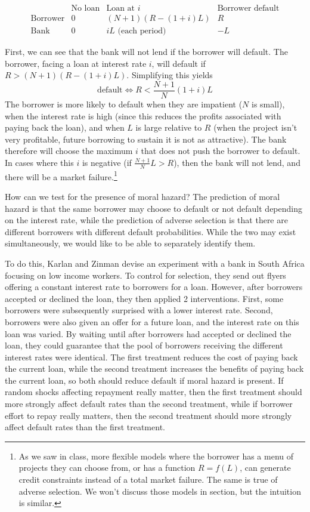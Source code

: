 \documentclass[12pt,english]{article}
\begin{document}
$$
\begin{array}{c|c|c|c}
& \text{No loan} & \text{Loan at } i & \text{Borrower default} \\
\hline
\text{Borrower} & 0 & (N + 1) (R - (1 + i)L) & R \\
\hline
\text{Bank} & 0 & iL \text{ (each period)} & -L
\end{array}
$$

First, we can see that the bank will not lend if the borrower will default. The borrower, facing a loan at interest rate $i$, will default if $R > (N + 1)(R - (1 + i)L)$. Simplifying this yields
$$ \text{default} \Leftrightarrow R < \frac{N+1}{N}(1+i)L $$
The borrower is more likely to default when they are impatient ($N$ is small), when the interest rate is high (since this reduces the profits associated with paying back the loan), and when $L$ is large relative to $R$ (when the project isn't very profitable, future borrowing to sustain it is not as attractive). The bank therefore will choose the maximum $i$ that does not push the borrower to default. In cases where this $i$ is negative (if $\frac{N+1}{N}L > R$), then the bank will not lend, and there will be a market failure.\footnote{As we saw in class, more flexible models where the borrower has a menu of projects they can choose from, or has a function $R = f(L)$, can generate credit constraints instead of a total market failure. The same is true of adverse selection. We won't discuss those models in section, but the intuition is similar.}

How can we test for the presence of moral hazard? The prediction of moral hazard is that the same borrower may choose to default or not default depending on the interest rate, while the prediction of adverse selection is that there are different borrowers with different default probabilities. While the two may exist simultaneously, we would like to be able to separately identify them.

To do this, Karlan and Zinman devise an experiment with a bank in South Africa focusing on low income workers. To control for selection, they send out flyers offering a constant interest rate to borrowers for a loan. However, after borrowers accepted or declined the loan, they then applied 2 interventions. First, some borrowers were subsequently surprised with a lower interest rate. Second, borrowers were also given an offer for a future loan, and the interest rate on this loan was varied. By waiting until after borrowers had accepted or declined the loan, they could guarantee that the pool of borrowers receiving the different interest rates were identical. The first treatment reduces the cost of paying back the current loan, while the second treatment increases the benefits of paying back the current loan, so both should reduce default if moral hazard is present. If random shocks affecting repayment really matter, then the first treatment should more strongly affect default rates than the second treatment, while if borrower effort to repay really matters, then the second treatment should more strongly affect default rates than the first treatment.
\end{document}
